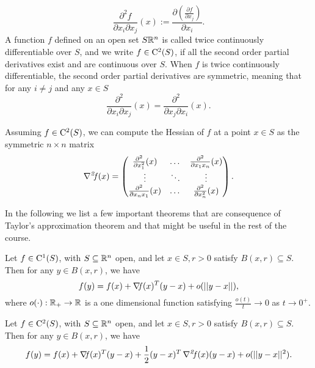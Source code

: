 \documentclass[10pt,a4paper]{article}
\begin{document}
\begin{equation*}
	\frac{\partial^2 f}{\partial x_i \partial x_j}(x) := \frac{\partial \left(\frac{\partial f}{\partial x_j}\right)}{\partial x_i}.
\end{equation*}
A function $f$ defined on an open set $S \mathbb{R}^n$ is called twice continuously differentiable over $S$, and we write $f\in \mathord{\mathrm{C^2}}(S)$, if all the second order partial derivatives exist and are continuous over $S$. When $f$ is twice continuously differentiable, the second order partial derivatives are symmetric, meaning that for any $i\neq j$ and any $x\in S$
\begin{equation*}
	\frac{\partial^2}{\partial x_i \partial x_j} (x) = \frac{\partial^2}{\partial x_j \partial x_i} (x).
\end{equation*}
\begin{definition}[Hessian]
	Assuming $f\in \mathord{\mathrm{C^2}}(S)$, we can compute the Hessian of $f$ at a point $x\in S$ as the symmetric $n\times n$ matrix
	\begin{equation*}
		\operatorname*{\mathit{\nabla^2 \!f}} (x) = \begin{pmatrix}
			\frac{\partial^2}{\partial x_1^2 } (x) & \dots & \frac{\partial^2}{\partial x_1 x_n } (x)\\
			\vdots & \ddots & \vdots\\
			\frac{\partial^2}{\partial x_n x_1 } (x) & \dots & \frac{\partial^2}{\partial x_n^2 } (x)
		\end{pmatrix}
	.
	\end{equation*}
\end{definition}
In the following we list a few important theorems that are consequence of Taylor's approximation theorem and that might be useful in the rest of the course. 
\begin{theorem}
	Let $f\in \mathord{\mathrm{C^1}}(S)$, with $S\subseteq \mathbb{R}^n$ open, and let $x\in S, r>0$ satisfy $B(x,r)\subseteq S$. Then for any $y\in B(x,r)$, we have 
	\begin{equation*}
		f(y) = f(x)+ \operatorname*{\mathit{\nabla \!f}} (x)^T(y-x) + o(||y-x||),
	\end{equation*}
where $o(\cdot):\mathbb{R}_+\to \mathbb{R}$ is a one dimensional function satisfying $\frac{o(t)}{t} \to 0$ as $t\to0^+$.
\end{theorem}
\begin{theorem}
Let $f\in \mathord{\mathrm{C^2}}(S)$, with $S\subseteq \mathbb{R}^n$ open, and let $x\in S, r>0$ satisfy $B(x,r)\subseteq S$. Then for any $y\in B(x,r)$, we have 
\begin{equation*}
	f(y) = f(x)+ \operatorname*{\mathit{\nabla \!f}} (x)^T(y-x) +\frac{1}{2}(y-x)^T\operatorname*{\mathit{\nabla^2 \!f}}(x)(y-x) +  o(||y-x||^2).
\end{equation*}
\end{theorem}
\end{document}
